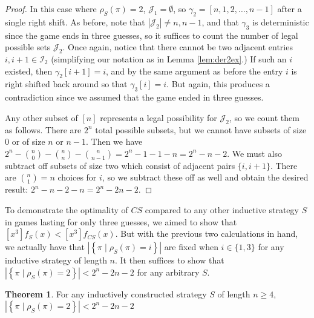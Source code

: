 \documentclass[article]{amsart}
\theoremstyle{definition}
\newtheorem{theorem}{Theorem}[section]
\theoremstyle{definition}
\theoremstyle{remark}
\begin{document}
\begin{proof}
In this case where $\rho_S(\pi) = 2$, $\mathcal{J}_1 = \emptyset$, so $\gamma_2 = [n,1,2,\dots,n-1]$ after a single right shift. As before, note that $|\mathcal{J}_2| \neq n, n-1$, and that $\gamma_3$ is deterministic since the game ends in three guesses, so it suffices to count the number of legal possible sets $\mathcal{J}_2$. Once again, notice that there cannot be two adjacent entries $i,i+1 \in \mathcal{I}_2$ (simplifying our notation as in Lemma \ref{lem:der2ex}.) If such an $i$ existed, then $\gamma_2[i+1] = i$, and by the same argument as before the entry $i$ is right shifted back around so that $\gamma_3[i] = i$. But again, this produces a contradiction since we assumed that the game ended in three guesses. %

Any other subset of $[n]$ represents a legal possibility for $\mathcal{J}_2$, so we count them as follows. There are $2^n$ total possible subsets, but we cannot have subsets of size 0 or of size $n$ or $n-1$. Then we have $2^n - \binom{n}{0} - \binom{n}{n} - \binom{n}{n-1} = 2^n - 1 - 1 - n = 2^n - n - 2$. We must also subtract off subsets of size two which consist of adjacent pairs $\{i,i+1\}$. There are $\binom{n}{1} = n$ choices for $i$, so we subtract these off as well and obtain the desired result: $2^n - n - 2 - n = 2^n - 2n - 2$.
    
\end{proof}

To demonstrate the optimality of $CS$ compared to any other inductive strategy $S$ in games lasting for only three guesses, we aimed to show that $[x^3]f_S(x) < [x^3]f_{CS}(x)$. But with the previous two calculations in hand, we actually have that $\left| \left\{ \pi \mid \rho_{S}(\pi) = i \right\} \right|$ are fixed when $i \in \{ 1,3\}$ for any inductive strategy of length $n$. It then suffices to show that $\left| \left\{ \pi \mid \rho_{S}(\pi) = 2 \right\} \right| < 2^n - 2n - 2$ for any arbitrary $S$. 

\begin{theorem} \label{thm:bestrho2}
    For any inductively constructed strategy $S$ of length $n \geq 4$, $\left| \left\{ \pi \mid \rho_{S}(\pi) = 2 \right\} \right| < 2^n - 2n - 2$
\end{theorem}
\end{document}
